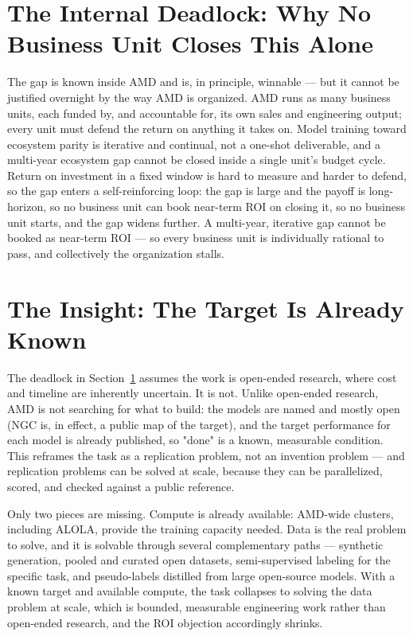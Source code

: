 \documentclass[blind]{gtac}
\begin{document}
\section{The Internal Deadlock: Why No Business Unit Closes This Alone}
\label{sec:deadlock}

The gap is known inside AMD and is, in principle, winnable --- but it cannot be justified overnight by the way AMD is organized. AMD runs as many business units, each funded by, and accountable for, its own sales and engineering output; every unit must defend the return on anything it takes on. Model training toward ecosystem parity is iterative and continual, not a one-shot deliverable, and a multi-year ecosystem gap cannot be closed inside a single unit's budget cycle. Return on investment in a fixed window is hard to measure and harder to defend, so the gap enters a self-reinforcing loop: the gap is large and the payoff is long-horizon, so no business unit can book near-term ROI on closing it, so no business unit starts, and the gap widens further. A multi-year, iterative gap cannot be booked as near-term ROI --- so every business unit is individually rational to pass, and collectively the organization stalls.

\section{The Insight: The Target Is Already Known}
\label{sec:insight}

The deadlock in Section~\ref{sec:deadlock} assumes the work is open-ended research, where cost and timeline are inherently uncertain. It is not. Unlike open-ended research, AMD is not searching for what to build: the models are named and mostly open (NGC is, in effect, a public map of the target), and the target performance for each model is already published, so "done" is a known, measurable condition. This reframes the task as a replication problem, not an invention problem --- and replication problems can be solved at scale, because they can be parallelized, scored, and checked against a public reference.

Only two pieces are missing. Compute is already available: AMD-wide clusters, including ALOLA, provide the training capacity needed. Data is the real problem to solve, and it is solvable through several complementary paths --- synthetic generation, pooled and curated open datasets, semi-supervised labeling for the specific task, and pseudo-labels distilled from large open-source models. With a known target and available compute, the task collapses to solving the data problem at scale, which is bounded, measurable engineering work rather than open-ended research, and the ROI objection accordingly shrinks.
\end{document}
